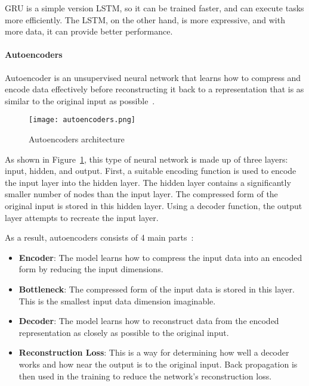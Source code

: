 \gls{GRU} is a simple version \gls{LSTM}, so it can be trained faster, and can execute tasks more efficiently. The \gls{LSTM}, on the other hand, is more expressive, and with more data, it can provide better performance.

\paragraph{Autoencoders}

Autoencoder is an unsupervised neural network that learns how to compress and encode data effectively before reconstructing it back to a representation that is as similar to the original input as possible~\cite{LopezPinaya2020Autoencoders}.

\begin{figure}[htbp]
    \centering
    \texttt{[image: autoencoders.png]}
    \caption{Autoencoders architecture~\cite{Madhavan2021DeepDeveloper}}
    \label{fig:autoencoders}
\end{figure}

As shown in Figure~\ref{fig:autoencoders}, this type of neural network is made up of three layers: input, hidden, and output. First, a suitable encoding function is used to encode the input layer into the hidden layer. The hidden layer contains a significantly smaller number of nodes than the input layer. The compressed form of the original input is stored in this hidden layer. Using a decoder function, the output layer attempts to recreate the input layer. 

As a result, autoencoders consists of 4 main parts~\cite{Abirami2020Energy-efficientSystem,LopezPinaya2020Autoencoders}:

\begin{itemize}
    \item \textbf{Encoder}: The model learns how to compress the input data into an encoded form by reducing the input dimensions.
    \item \textbf{Bottleneck}: The compressed form of the input data is stored in this layer. This is the smallest input data dimension imaginable.
    \item \textbf{Decoder}: The model learns how to reconstruct data from the encoded representation as closely as possible to the original input.
    \item \textbf{Reconstruction Loss}: This is a way for determining how well a decoder works and how near the output is to the original input. Back propagation is then used in the training to reduce the network's reconstruction loss.
\end{itemize}

